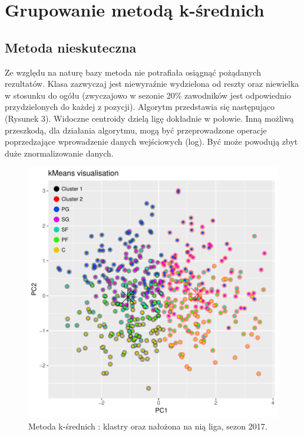 \documentclass[twoside,twocolumn]{article}
\begin{document}
\section{Grupowanie metodą k-średnich}

\subsection{Metoda nieskuteczna}

\indent Ze względu na naturę bazy metoda nie potrafiała osiągnąć pożądanych rezultatów. Klasa zazwyczaj jest niewyraźnie wydzielona od reszty oraz niewielka w stosunku do ogółu (zwyczajowo w sezonie 20\% zawodników jest odpowiednio przydzielonych do każdej z pozycji). Algorytm przedstawia się następująco (Rysunek 3). Widoczne centroidy dzielą ligę dokładnie w połowie. Inną możliwą przeszkodą, dla działania algorytmu, mogą być przeprowadzone operacje poprzedzające wprowadzenie danych wejściowych (log). Być może powodują zbyt duże znormalizowanie danych.

\begin{figure}[hbt!]
  \centering
    \includegraphics[width=\linewidth]{plot_kclust.pdf}
  \caption{Metoda k-średnich : klastry oraz nałożona na nią liga, sezon 2017.}
  \label{fig:coffee}
\end{figure}
\end{document}
